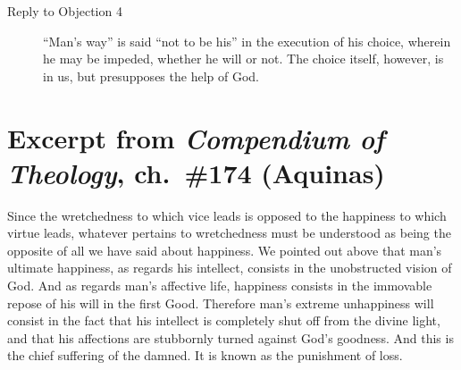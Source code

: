 \documentclass[10pt,article,twoside]{memoir}
\begin{document}
\begin{multicols}{2}
\begin{description}
		\item[Reply to Objection 4] ``Man's way'' is said ``not to be his'' in the execution of his choice, wherein he may be impeded, whether he will or not. The choice itself, however, is in us, but presupposes the help of God.
		
	\end{description}
	\section{Excerpt from \emph{Compendium of Theology}, ch.~\#174 (Aquinas)}
	Since the wretchedness to which vice leads is opposed to the happiness to which virtue leads, whatever pertains to wretchedness must be understood as being the opposite of all we have said about happiness. We pointed out above that man’s ultimate happiness, as regards his intellect, consists in the unobstructed vision of God. And as regards man’s affective life, happiness consists in the immovable repose of his will in the first Good. Therefore man’s extreme unhappiness will consist in the fact that his intellect is completely shut off from the divine light, and that his affections are stubbornly turned against God’s goodness. And this is the chief suffering of the damned. It is known as the punishment of loss.
	

\end{multicols}
\end{document}

